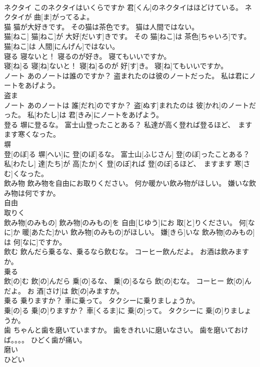 \documentclass[8pt]{extreport}
\begin{document}
\begin{CJK}{UTF8}{min}
\\	ネクタイ このネクタイはいくらですか 君[くん]のネクタイはほどけている。 ネクタイが 曲[ま]がってるよ。
\\	猫 猫が大好きです。 その猫は茶色です。 猫は人間ではない。	
\\	猫[ねこ] 猫[ねこ]が 大好[だいす]きです。 その 猫[ねこ]は 茶色[ちゃいろ]です。 猫[ねこ]は 人間[にんげん]ではない。
\\	寝る 寝ないと！ 寝るのが好き。 寝てもいいですか。	
\\	寝[ね]る 寝[ね]ないと！ 寝[ね]るのが 好[す]き。 寝[ね]てもいいですか。
\\	ノート あのノートは誰のですか？ 盗まれたのは彼のノートだった。 私は君にノートをあげよう。	
\\	盗ま 
\\	ノート あのノートは 誰[だれ]のですか？ 盗[ぬす]まれたのは 彼[かれ]のノートだった。 私[わたし]は 君[きみ]にノートをあげよう。
\\	登る 塀に登るな。 富士山登ったことある？ 私達が高く登れば登るほど、　ますます寒くなった。	
\\	塀 
\\	登[のぼ]る 塀[へい]に 登[のぼ]るな。 富士山[ふじさん] 登[のぼ]ったことある？ 私[わたし] 達[たち]が 高[たか]く 登[のぼ]れば 登[のぼ]るほど、　ますます 寒[さむ]くなった。
\\	飲み物 飲み物を自由にお取りください。 何か暖かい飲み物がほしい。 嫌いな飲み物は何ですか。	
\\	自由 
\\	取りく 
\\	飲み物[のみもの] 飲み物[のみもの]を 自由[じゆう]にお 取[と]りください。 何[なに]か 暖[あたた]かい 飲み物[のみもの]がほしい。 嫌[きら]いな 飲み物[のみもの]は 何[なに]ですか。
\\	飲む 飲んだら乗るな、乗るなら飲むな。 コーヒー飲んだよ。 お酒は飲みますか。	
\\	乗る 
\\	飲[の]む 飲[の]んだら 乗[の]るな、 乗[の]るなら 飲[の]むな。 コーヒー 飲[の]んだよ。 お 酒[さけ]は 飲[の]みますか。
\\	乗る 乗りますか？ 車に乗って。 タクシーに乗りましょうか。	
\\	乗[の]る 乗[の]りますか？ 車[くるま]に 乗[の]って。 タクシーに 乗[の]りましょうか。
\\	歯 ちゃんと歯を磨いていますか。 歯をきれいに磨いなさい。 歯を磨いておけば。。。。 ひどく歯が痛い。	
\\	磨い 
\\	ひどい 

\end{CJK}
\end{document}
